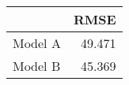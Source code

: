 
\begin{tabular}{l|r}
\hline
  & RMSE\\
\hline
Model A & 49.471\\
\hline
Model B & 45.369\\
\hline
\end{tabular}
